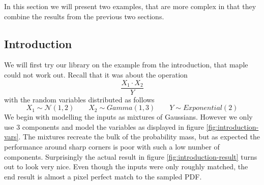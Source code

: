 \documentclass[11pt,a4paper]{book}
\begin{document}
In this section we will present two examples, that are more complex in that they
combine the results from the previous two sections.

\subsection{Introduction}

We will first try our library on the example from the introduction, that maple
could not work out. Recall that it was about the operation
\begin{equation*}
  \frac{X_{1} \cdot X_{2}}{Y}
\end{equation*}
with the random variables distributed as follows
\begin{equation*}
  X_{1} \sim \mathcal{N}(1, 2) \qquad X_{2} \sim Gamma(1, 3) \qquad Y \sim Exponential(2)
\end{equation*}
We begin with modelling the inputs as mixtures of Gaussians. However we only use
$3$ components and model the variables as displayed in figure
\ref{fig:introduction-vars}. The mixtures recreate the bulk of the probability
mass, but as expected the performance around sharp corners is poor with such a
low number of components. Surprisingly the actual result in figure
\ref{fig:introduction-result} turns out to look very nice. Even though the
inputs were only roughly matched, the end result is almost a pixel perfect match
to the sampled PDF.
\end{document}
